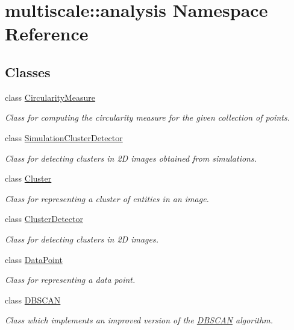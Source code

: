 \hypertarget{namespacemultiscale_1_1analysis}{\section{multiscale\-:\-:analysis \-Namespace \-Reference}
\label{namespacemultiscale_1_1analysis}
}
\subsection*{\-Classes}
\begin{DoxyCompactItemize}
\item 
class \hyperlink{classmultiscale_1_1analysis_1_1CircularityMeasure}{\-Circularity\-Measure}
\begin{DoxyCompactList}\small\item\em \-Class for computing the circularity measure for the given collection of points. \end{DoxyCompactList}\item 
class \hyperlink{classmultiscale_1_1analysis_1_1SimulationClusterDetector}{\-Simulation\-Cluster\-Detector}
\begin{DoxyCompactList}\small\item\em \-Class for detecting clusters in 2\-D images obtained from simulations. \end{DoxyCompactList}\item 
class \hyperlink{classmultiscale_1_1analysis_1_1Cluster}{\-Cluster}
\begin{DoxyCompactList}\small\item\em \-Class for representing a cluster of entities in an image. \end{DoxyCompactList}\item 
class \hyperlink{classmultiscale_1_1analysis_1_1ClusterDetector}{\-Cluster\-Detector}
\begin{DoxyCompactList}\small\item\em \-Class for detecting clusters in 2\-D images. \end{DoxyCompactList}\item 
class \hyperlink{classmultiscale_1_1analysis_1_1DataPoint}{\-Data\-Point}
\begin{DoxyCompactList}\small\item\em \-Class for representing a data point. \end{DoxyCompactList}\item 
class \hyperlink{classmultiscale_1_1analysis_1_1DBSCAN}{\-D\-B\-S\-C\-A\-N}
\begin{DoxyCompactList}\small\item\em \-Class which implements an improved version of the \hyperlink{classmultiscale_1_1analysis_1_1DBSCAN}{\-D\-B\-S\-C\-A\-N} algorithm. \end{DoxyCompactList}\item 

\end{DoxyCompactItemize}
